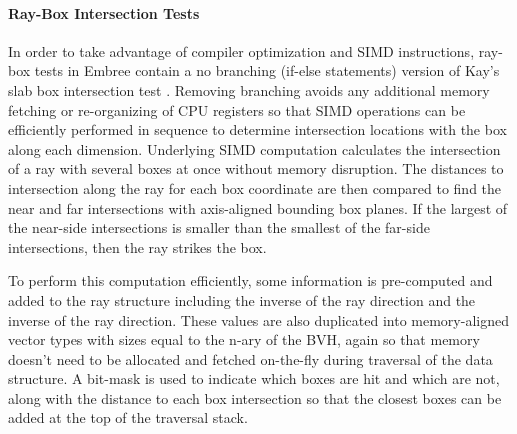 \paragraph{Ray-Box Intersection Tests}

In order to take advantage of compiler optimization and SIMD instructions,
ray-box tests in Embree contain a no branching (if-else statements) version of
Kay's slab box intersection test \cite{Kay_1986}. Removing branching avoids any
additional memory fetching or re-organizing of CPU registers so that SIMD
operations can be efficiently performed in sequence to determine intersection
locations with the box along each dimension. Underlying SIMD computation
calculates the intersection of a ray with several boxes at once without memory
disruption. The distances to intersection along the ray for each box coordinate
are then compared to find the near and far intersections with axis-aligned
bounding box planes. If the largest of the near-side intersections is smaller
than the smallest of the far-side intersections, then the ray strikes the box.

To perform this computation efficiently, some information is pre-computed and
added to the ray structure including the inverse of the ray direction and the
inverse of the ray direction. These values are also duplicated into
memory-aligned vector types with sizes equal to the n-ary of the BVH, again so
that memory doesn't need to be allocated and fetched on-the-fly during traversal
of the data structure. A bit-mask is used to indicate which boxes are hit and
which are not, along with the distance to each box intersection so that the
closest boxes can be added at the top of the traversal stack.

